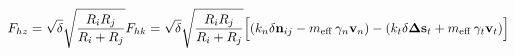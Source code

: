 \documentclass[12pt]{article}
\begin{document}
$$
   F_{hz} = \sqrt{\delta} \sqrt{\frac{R_i R_j}{R_i + R_j}} F_{hk} = 
     \sqrt{\delta} \sqrt{\frac{R_i R_j}{R_i + R_j}} 
     \Big[ (k_n \delta \mathbf{n}_{ij} -  
       m_{\mbox{\scriptsize{eff}}} \: \gamma_n \mathbf{ v}_n) -
       (k_t \delta\mathbf{ \Delta s}_t +
       m_{\mbox{\scriptsize{eff}}} \: \gamma_t \mathbf{v}_t) \Big]
$$
\end{document}
